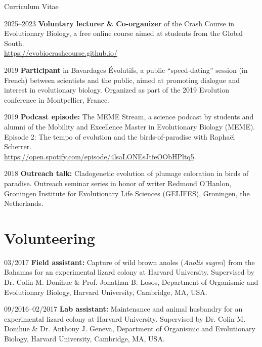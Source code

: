 \documentclass[11pt,a4paper]{article}
\begin{document}
\begin{cv}{Curriculum Vitae}
		\begin{cvlist}{}

            \item[2025--2023] \textbf{Voluntary lecturer \& Co-organizer} of the Crash Course in Evolutionary Biology, a free online course aimed at students from the Global South.\\
            \url{https://evobiocrashcourse.github.io/}

            \item[2019]
            \textbf{Participant} in Bavardages Évolutifs, a public ``speed-dating'' session (in French) between scientists and the public, aimed at promoting dialogue and interest in evolutionary biology. Organized as part of the 2019 Evolution conference in Montpellier, France.
            
			\item[2019] \textbf{Podcast episode:} The MEME Stream, a science podcast by students and alumni of the Mobility and Excellence Master in Evolutionary Biology (MEME). Episode 2: The tempo of evolution and the birds-of-paradise with Raphaël Scherrer.\\
			\url{https://open.spotify.com/episode/4lsaLONEsJtfeOObHPltq5}.
			
			\item[2018] \textbf{Outreach talk:} Cladogenetic evolution of plumage coloration in birds of paradise. Outreach seminar series in honor of writer Redmond O'Hanlon, Groningen Institute for Evolutionary Life Sciences (GELIFES), Groningen, the Netherlands.
	
		\end{cvlist}
		
		\section{Volunteering}
		
		\begin{cvlist}{}
		
			\item[03/2017] \textbf{Field assistant:} Capture of wild brown anoles (\textit{Anolis sagrei}) from the Bahamas for an experimental lizard colony at Harvard University. Supervised by Dr. Colin M. Donihue \& Prof. Jonathan B. Losos, Department of Organismic and Evolutionary Biology, Harvard University, Cambridge, MA, USA.
		
			\item[09/2016--02/2017] \textbf{Lab assistant:} Maintenance and animal husbandry for an experimental lizard colony at Harvard University. Supervised by Dr. Colin M. Donihue \& Dr. Anthony J. Geneva, Department of Organismic and Evolutionary Biology, Harvard University, Cambridge, MA, USA.
		

\end{cvlist}
\end{cv}
\end{document}
